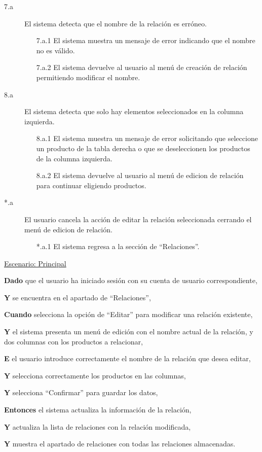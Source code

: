 \begin{description}
    
    \item[7.a] El sistema detecta que el nombre de la relación es erróneo.
    \begin{enumerate}
        \item[7.a.1] El sistema muestra un mensaje de error indicando que el nombre no es válido.
        \item[7.a.2] El sistema devuelve al usuario al menú de creación de relación permitiendo modificar el nombre.
    \end{enumerate}
    
    \item[8.a] El sistema detecta que solo hay elementos seleccionados en la columna izquierda.
    \begin{enumerate}
        \item[8.a.1] El sistema muestra un mensaje de error solicitando que seleccione un producto de la tabla derecha o que se deseleccionen los productos de la columna izquierda.
        \item[8.a.2] El sistema devuelve al usuario al menú de edicion de relación para continuar eligiendo productos.
    \end{enumerate}

    \item[*.a] El usuario cancela la acción de editar la relación seleccionada cerrando el menú de edicion de relación.
    \begin{enumerate}
        \item[*.a.1] El sistema regresa a la sección de \enquote{Relaciones}.
    \end{enumerate}
\end{description}

\underline{Escenario: Principal}\par
\vspace{0.15cm}
\textbf{Dado} que el usuario ha iniciado sesión con su cuenta de usuario correspondiente,\par
\textbf{Y} se encuentra en el apartado de \enquote{Relaciones},\par
\textbf{Cuando} selecciona la opción de \enquote{Editar} para modificar una relación existente,\par
\textbf{Y} el sistema presenta un menú de edición con el nombre actual de la relación, y dos columnas con los productos a relacionar,\par
\textbf{E} el usuario introduce correctamente el nombre de la relación que desea editar,\par
\textbf{Y} selecciona correctamente los productos en las columnas,\par
\textbf{Y} selecciona \enquote{Confirmar} para guardar los datos,\par
\textbf{Entonces} el sistema actualiza la información de la relación,\par
\textbf{Y} actualiza la lista de relaciones con la relación modificada,\par
\textbf{Y} muestra el apartado de relaciones con todas las relaciones almacenadas.\par

